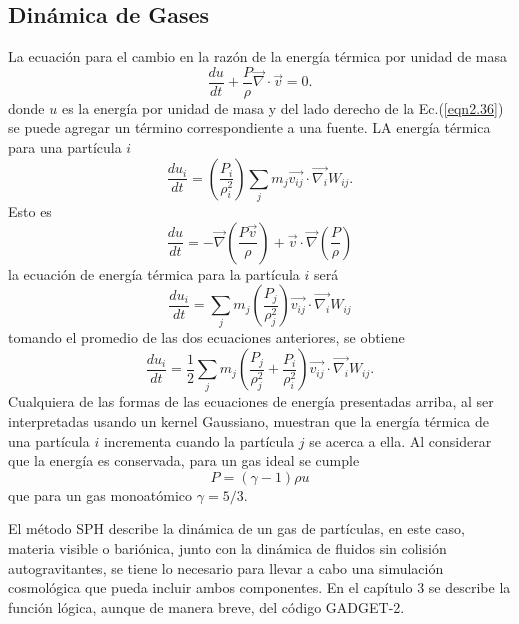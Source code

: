 \documentclass[a4paper,openright,12pt]{book}
\begin{document}
\subsection{Dinámica de Gases}
La ecuación para el cambio en la razón de la energía térmica por unidad de masa 
\begin{equation}
\frac{d u}{d t} 
+ 
\frac{P}{\rho} \vec{\nabla} \cdot \vec{v}=0.\label{eqn2.36}
\end{equation} 
donde $u$ es la energía por unidad de masa y del lado derecho de la Ec.(\ref{eqn2.36}) se puede agregar un término correspondiente a una fuente. LA energía térmica para una partícula $i$
\begin{equation}
\frac{d u_{i}}{d t}
=
\left(\frac{P_{i}}{\rho_{i}^{2}}\right)
\sum_{j} m_{j} \vec{v_{ij}} \cdot \vec{\nabla_{i}} W_{ij}.\label{eqn2.37}
\end{equation}
 Esto es
\begin{equation}
\frac{d u}{d t} 
=
-\vec{\nabla} \left(\frac{P\vec{v}}{\rho}\right)
+
\vec{v}\cdot\vec{\nabla}\left(\frac{P}{\rho}\right)\label{eqn2.38}
\end{equation}
la ecuación de energía térmica para la partícula $i$ será
\begin{equation}
\frac{d u_{i}}{d t}
=
\sum_{j} m_{j} \left(\frac{P_{j}}{\rho_{j}^2}\right) \vec{v_{ij}} \cdot \vec{\nabla_{i}} W_{ij}\label{eqn2.39}
\end{equation}
tomando el promedio de las dos ecuaciones anteriores, se obtiene
\begin{equation}
\frac{d u_{i}}{d t}
=\frac{1}{2}
\sum_{j} m_{j} \left(\frac{P_{j}}{\rho_{j}^2} + \frac{P_{i}}{\rho_{i}^2}\right) \vec{v_{ij}} \cdot \vec{\nabla_{i}} W_{ij}.\label{eqn2.40}
\end{equation}
Cualquiera de las formas de las ecuaciones de energía presentadas arriba, al ser interpretadas usando un kernel Gaussiano, muestran que la energía térmica de una partícula $i$ incrementa cuando la partícula $j$ se acerca a ella.
Al considerar que la energía es conservada, para un gas ideal se cumple
\begin{equation}
 P
 =
 (\gamma - 1)\rho u
\end{equation}
que para un gas monoatómico $\gamma = 5/3$.

El método SPH describe la dinámica de un gas de partículas, en este caso, materia visible o bariónica, junto con la dinámica de fluidos sin colisión autogravitantes, se tiene lo necesario para llevar a cabo una simulación cosmológica que pueda incluir ambos componentes. En el capítulo 3 se describe la función lógica, aunque de manera breve, del código GADGET-2.
\end{document}
